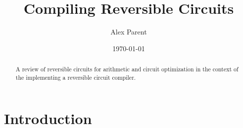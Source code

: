 \documentclass{report}
\begin{document}
\listoftodos

\title{Compiling Reversible Circuits}
\author{Alex Parent}
\date{\today}
\maketitle

\begin{abstract}
  A review of reversible circuits for arithmetic and circuit optimization in the context of the implementing a reversible circuit compiler.
\end{abstract}
\setcounter{tocdepth}{1}
\tableofcontents

\chapter{Introduction}







\end{document}

